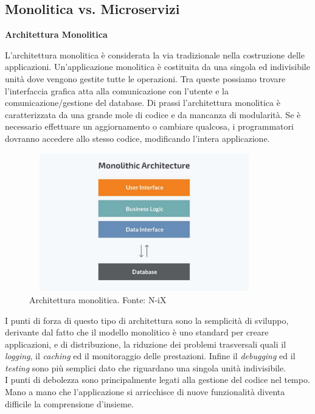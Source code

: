 \subsection{Monolitica vs. Microservizi}
\begin{flushleft}
\textbf{{\large Architettura Monolitica}}
\end{flushleft}

L'architettura monolitica è considerata la via tradizionale nella costruzione delle applicazioni. Un'applicazione monolitica è costituita da una singola ed indivisibile unità dove vengono gestite tutte le operazioni. Tra queste possiamo trovare l'interfaccia grafica atta alla comunicazione con l'utente e la comunicazione/gestione del database. Di prassi l'architettura monolitica è caratterizzata da una grande mole di codice e da mancanza di modularità. Se è necessario effettuare un aggiornamento o cambiare qualcosa, i programmatori dovranno accedere allo stesso codice, modificando l'intera applicazione.

\begin{figure}[H]
    \centering
    \includegraphics[width=10cm, height=6cm]{images/mono.pdf}
    \caption{Architettura monolitica. Fonte: N-iX}
\end{figure}

I punti di forza di questo tipo di architettura sono la semplicità di sviluppo, derivante dal fatto che il modello monolitico è uno standard per creare applicazioni, e di distribuzione, la riduzione dei problemi trasversali quali il \textit{logging}, il \textit{caching} ed il monitoraggio delle prestazioni. Infine il \textit{debugging} ed il \textit{testing} sono più semplici dato che riguardano una singola unità indivisibile.\\
I punti di debolezza sono principalmente legati alla gestione del codice nel tempo. Mano a mano che l'applicazione si arricchisce di nuove funzionalità diventa difficile la comprensione d'insieme.

